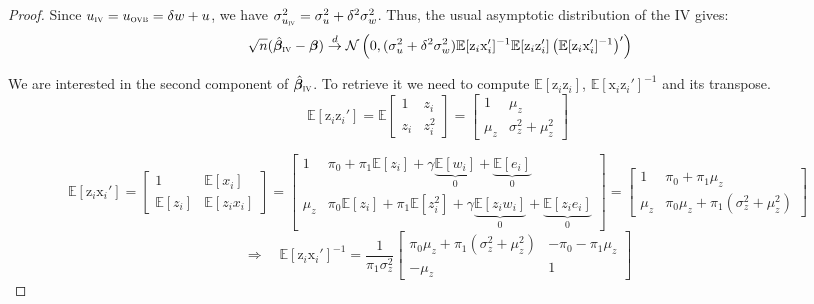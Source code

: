 \documentclass[usletter, 12pt]{article}
\begin{document}
	\begin{proof}
			Since $u_{\textsc{iv}} = u_{\textsc{ovb}} = \delta w + u$, we have $\sigma_{u_{\textsc{iv}}}^2 = \sigma_{u}^{2} + \delta^{2}\sigma_{w}^{2}$. Thus, the usual asymptotic distribution of the IV gives:
				~
				\[ \sqrt{n}(\hat{\bm{\beta}}_{\textsc{iv}} - \bm{\beta}) \overset{d}{\to} 
					\mathcal{N}\left(0,  (\sigma_{u}^{2} + \delta^{2}\sigma_{w}^{2}) \mathbb{E}[\text{z}_{i}\text{x}_{i}']^{-1} \mathbb{E}[\text{z}_{i}\text{z}_{i}'] \left( \mathbb{E}[\text{z}_{i}\text{x}_{i}']^{-1}\right)' \right) \]
					
			We are interested in the second component of $\hat{\bm{\beta}}_{\textsc{iv}}$. To retrieve it we need to compute $\mathbb{E}[\text{z}_{i} \text{z}_{i}]$, $\mathbb{E}[\text{x}_{i}\text{z}_{i}']^{-1}$ and its transpose.  
			~
			\[ 
				\mathbb{E}[\text{z}_{i}\text{z}_i'] 
				= \mathbb{E} \begin{bmatrix}
					1 & z_{i}\\ 
					z_{i} & z_{i}^{2}
				\end{bmatrix} 
				=
				\begin{bmatrix}
					1 & \mu_{z}\\ 
					\mu_{z} & \sigma_{z}^{2} + \mu_{z}^2
				\end{bmatrix} 
				\]
			
			\[ 
				\mathbb{E}[\text{z}_{i}\text{x}_i'] 
				=
				\begin{bmatrix}
					1 & \mathbb{E}[x_{i}]\\ 
					\mathbb{E}[z_{i}] & \mathbb{E}[z_{i}x_{i}]
				\end{bmatrix} 
				=
				\begin{bmatrix}
					1 & \pi_0 + \pi_1 \mathbb{E}[z_{i}] + \gamma \underbrace{\mathbb{E}[w_{i}]}_{0} + \underbrace{\mathbb{E}[e_{i}]}_{0}\\ 
					\mu_{z} & \pi_0 \mathbb{E}[z_{i}] + \pi_1 \mathbb{E}[z_{i}^{2}] + \gamma \underbrace{\mathbb{E}[z_{i}w_{i}]}_{0} + \underbrace{\mathbb{E}[z_{i}e_{i}]}_{0}
				\end{bmatrix} =
				\begin{bmatrix}
					1 & \pi_0 + \pi_1 \mu_{z}\\ 
					\mu_{z} & \pi_0\mu_z + \pi_1 (\sigma_{z}^{2} + \mu_{z}^{2})
				\end{bmatrix} 
			\]
			\[
				 \Rightarrow \quad
				     \mathbb{E}[\text{z}_{i}\text{x}_i']^{-1} = \dfrac{1}{\pi_1 \sigma_{z}^{2}} 
				     			\begin{bmatrix}
								 \pi_0 \mu_z + \pi_1 (\sigma_{z}^{2} + \mu_{z}^{2})& - \pi_0 - \pi_1 \mu_{z}\\ 
								 -\mu_{z} & 1
							\end{bmatrix} 
			\]
			

\end{proof}
\end{document}
